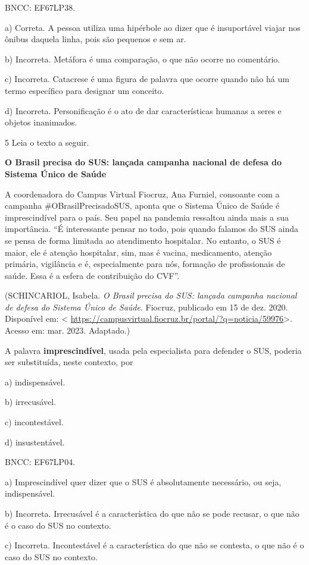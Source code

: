 {BNCC: EF67LP38.

a) Correta. A pessoa utiliza uma hipérbole ao dizer que é insuportável
viajar nos ônibus daquela linha, pois são pequenos e sem ar.

b) Incorreta. Metáfora é uma comparação, o que não ocorre no comentário.

c) Incorreta. Catacrese é uma figura de palavra que ocorre quando não há
um termo específico para designar um conceito.

d) Incorreta. Personificação é o ato de dar características humanas a
seres e objetos inanimados.

\num{5} Leia o texto a seguir.

\textbf{O Brasil precisa do SUS: lançada campanha nacional de defesa do
Sistema Único de Saúde}

A coordenadora do Campus Virtual Fiocruz, Ana Furniel, consoante com a
campanha \#OBrasilPrecisadoSUS, aponta que o Sistema Único de Saúde é
imprescindível para o país. Seu papel na pandemia ressaltou ainda mais a
sua importância. ``É interessante pensar no todo, pois quando falamos do
SUS ainda se pensa de forma limitada ao atendimento hospitalar. No
entanto, o SUS é maior, ele é atenção hospitalar, sim, mas é vacina,
medicamento, atenção primária, vigilância e é, especialmente para nós,
formação de profissionais de saúde. Essa é a esfera de contribuição do
CVF''.

(SCHINCARIOL, Isabela. \emph{O Brasil precisa do SUS: lançada campanha
nacional de defesa do Sistema Único de Saúde}. Fiocruz, publicado em 15
de dez. 2020. Disponível em: \textless{}
\url{https://campusvirtual.fiocruz.br/portal/?q=noticia/59976}\textgreater.
Acesso em: mar. 2023. Adaptado.)

A palavra \textbf{imprescindível}, usada pela especialista para defender
o SUS, poderia ser substituída, neste contexto, por

a) indispensável.

b) irrecusável.

c) incontestável.

d) insustentável.

BNCC: EF67LP04.

a) Imprescindível quer dizer que o SUS é absolutamente necessário, ou
seja, indispensável.

b) Incorreta. Irrecusável é a característica do que não se pode recusar,
o que não é o caso do SUS no contexto.

c) Incorreta. Incontestável é a característica do que não se contesta, o
que não é o caso do SUS no contexto.

}
